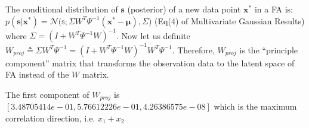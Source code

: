 \documentclass[12pt,letterpaper]{article}
\begin{document}
The conditional distribution of $\mathbf{s}$ (posterior) of a new data point $\mathbf{x}^*$ in a FA is:
 $p(\mathbf{s} | \mathbf{x}^*) = \mathcal{N}\big(\mathbb{s}; \Sigma W^T\Psi^{-1}(\mathbf{x}^* - \boldsymbol{\mu}), \Sigma\big)$ (Eq(4) of Multivariate Gaussian Results) where $\Sigma = (I + W^T\Psi^{-1}W)^{-1}$. Now let us definite $W_{proj} \triangleq \Sigma W^T\Psi^{-1} = (I + W^T\Psi^{-1}W)^{-1}W^T\Psi^{-1}$. Therefore, $W_{proj}$ is the ``principle component'' matrix that transforms the observation data to the latent space of FA instead of the $W$ matrix. 
 
The first component of $W_{proj}$ is $[3.48705414e-01,   5.76612226e-01,  4.26386575e-08]$ which is the maximum correlation direction, i.e. $x_1+x_2$
\end{document}
